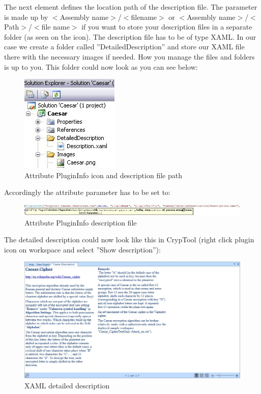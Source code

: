 The next element defines the location path of the description file. The parameter is made up by $<$Assembly name$>$/$<$filename$>$ or $<$Assembly name$>$/$<$Path$>$/$<$file name$>$ if you want to store your description files in a separate folder (as seen on the icon). The description file has to be of type XAML. In our case we create a folder called ''DetailedDescription'' and store our XAML file there with the necessary images if needed. How you manage the files and folders is up to you. This folder could now look as you can see below:
\begin{figure}[h!]
	\centering
		\includegraphics{figures/attribute_plugininfo_detailed_descr_path.jpg}
	\caption{Attribute PluginInfo icon and description file path}
	\label{fig:attribute_plugininfo_icon_path}
\end{figure}

Accordingly the attribute parameter has to be set to:
\begin{figure}[h!]
	\centering
		\includegraphics[width=1.00\textwidth]{figures/attribute_plugininfo_detailed_descr.jpg}
	\caption{Attribute PluginInfo description file}
	\label{fig:attribute_plugininfo_icon}
\end{figure}

The detailed description could now look like this in CrypTool (right click plugin icon on workspace and select ''Show description''):\clearpage
\begin{figure}[h!]
	\centering
		\includegraphics[width=1.00\textwidth]{figures/xaml_description.jpg}
	\caption{XAML detailed description}
	\label{fig:xaml_description}
\end{figure}

